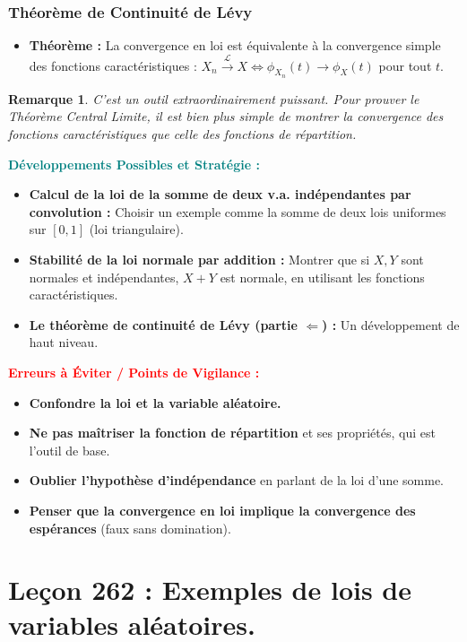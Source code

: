 \documentclass[12pt, a4paper, parskip=full]{report}
\theoremstyle{agregstyle}
\newtheorem{remark}[definition]{Remarque}
\newenvironment{developpements}
  {\par\medskip\noindent\begin{oframed}\noindent\textbf{\textcolor{teal}{Développements Possibles et Stratégie :}}}
  {\end{oframed}\par\medskip}
\newenvironment{erreurs}
  {\par\medskip\noindent\begin{oframed}\noindent\textbf{\textcolor{red}{Erreurs à Éviter / Points de Vigilance :}}}
  {\end{oframed}\par\medskip}
\begin{document}
\subsection{Théorème de Continuité de Lévy}
\begin{itemize}
    \item \textbf{Théorème :} La convergence en loi est équivalente à la convergence simple des fonctions caractéristiques : $X_n \xrightarrow{\mathcal{L}} X \iff \phi_{X_n}(t) \to \phi_X(t)$ pour tout $t$.
\end{itemize}
\begin{remark}
    C'est un outil extraordinairement puissant. Pour prouver le Théorème Central Limite, il est bien plus simple de montrer la convergence des fonctions caractéristiques que celle des fonctions de répartition.
\end{remark}

\begin{developpements}
    \begin{itemize}
        \item \textbf{Calcul de la loi de la somme de deux v.a. indépendantes par convolution :} Choisir un exemple comme la somme de deux lois uniformes sur $[0,1]$ (loi triangulaire).
        \item \textbf{Stabilité de la loi normale par addition :} Montrer que si $X,Y$ sont normales et indépendantes, $X+Y$ est normale, en utilisant les fonctions caractéristiques.
        \item \textbf{Le théorème de continuité de Lévy (partie $\Leftarrow$) :} Un développement de haut niveau.
    \end{itemize}
\end{developpements}

\begin{erreurs}
    \begin{itemize}
        \item \textbf{Confondre la loi et la variable aléatoire.}
        \item \textbf{Ne pas maîtriser la fonction de répartition} et ses propriétés, qui est l'outil de base.
        \item \textbf{Oublier l'hypothèse d'indépendance} en parlant de la loi d'une somme.
        \item \textbf{Penser que la convergence en loi implique la convergence des espérances} (faux sans domination).
    \end{itemize}
\end{erreurs}
\chapter{Leçon 262 : Exemples de lois de variables aléatoires.}
\end{document}
